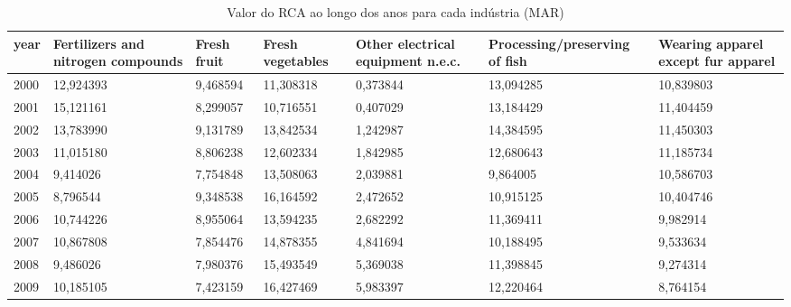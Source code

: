 \begin{table}
\centering
\caption{Valor do RCA ao longo dos anos para cada indústria (MAR)}
\begin{tabular}{p{1cm}p{2cm}p{2cm}p{2cm}p{2cm}p{2cm}p{2cm}}
\toprule
 year &  Fertilizers and nitrogen compounds &  Fresh fruit &  Fresh vegetables &  Other electrical equipment n.e.c. &  Processing/preserving of fish &  Wearing apparel except fur apparel \\
\midrule
 2000 &                           12,924393 &     9,468594 &         11,308318 &                           0,373844 &                      13,094285 &                           10,839803 \\
 2001 &                           15,121161 &     8,299057 &         10,716551 &                           0,407029 &                      13,184429 &                           11,404459 \\
 2002 &                           13,783990 &     9,131789 &         13,842534 &                           1,242987 &                      14,384595 &                           11,450303 \\
 2003 &                           11,015180 &     8,806238 &         12,602334 &                           1,842985 &                      12,680643 &                           11,185734 \\
 2004 &                            9,414026 &     7,754848 &         13,508063 &                           2,039881 &                       9,864005 &                           10,586703 \\
 2005 &                            8,796544 &     9,348538 &         16,164592 &                           2,472652 &                      10,915125 &                           10,404746 \\
 2006 &                           10,744226 &     8,955064 &         13,594235 &                           2,682292 &                      11,369411 &                            9,982914 \\
 2007 &                           10,867808 &     7,854476 &         14,878355 &                           4,841694 &                      10,188495 &                            9,533634 \\
 2008 &                            9,486026 &     7,980376 &         15,493549 &                           5,369038 &                      11,398845 &                            9,274314 \\
 2009 &                           10,185105 &     7,423159 &         16,427469 &                           5,983397 &                      12,220464 &                            8,764154 \\

\end{tabular}
\end{table}
